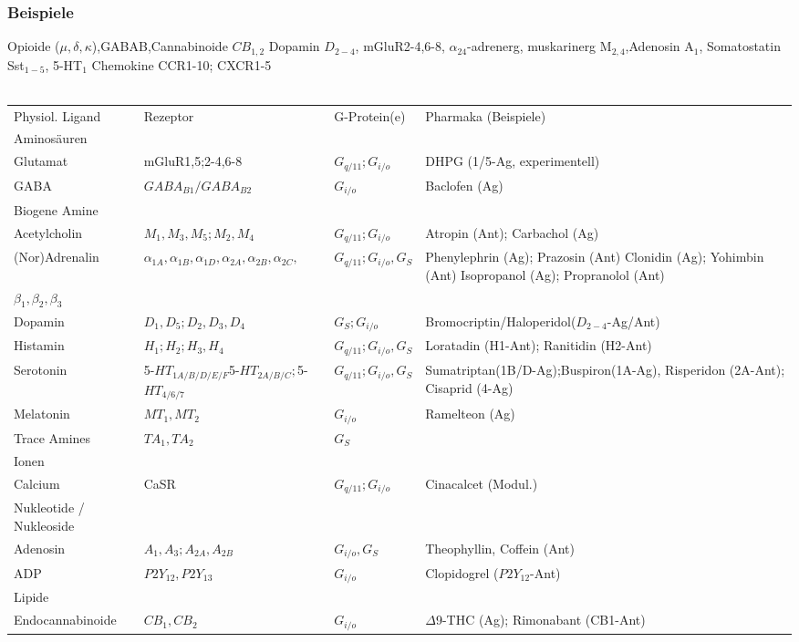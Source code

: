 \documentclass[10pt,a4paper]{report}
\begin{document}
\subsubsection{Beispiele}Opioide ($\mu,\delta,\kappa$),GABAB,Cannabinoide $CB_{1,2}$	Dopamin $D_{2-4}$, mGluR2-4,6-8, $\alpha_24$-adrenerg, muskarinerg M$_{2,4}$,Adenosin A$_1$, Somatostatin Sst$_{1-5}$, 5-HT$_1$
Chemokine CCR1-10; CXCR1-5 \\ \\
\scriptsize
\begin{tabularx}{\textwidth}{XXXX}
Physiol. Ligand&Rezeptor&G-Protein(e)&Pharmaka (Beispiele)\\
Aminosäuren&&&\\
Glutamat&mGluR1,5;2-4,6-8&$G_{q/11}; G_{i/o}$&DHPG (1/5-Ag, experimentell)\\
GABA&$GABA_{B1} / GABA_{B2}$&$G_{i/o}$&Baclofen (Ag)\\
Biogene Amine&&&\\
Acetylcholin&$M_1, M_3, M_5; M_2, M_4$&$G_{q/11}; G_{i/o}$&Atropin (Ant); Carbachol (Ag)\\
(Nor)Adrenalin& $\alpha_{1A}, \alpha_{1B}, \alpha_{1D}, \alpha_{2A}, \alpha_{2B}, \alpha_{2C}, $&$G_{q/11}; G_{i/o}, G_S$&Phenylephrin (Ag); Prazosin (Ant)  Clonidin (Ag); Yohimbin (Ant) Isopropanol (Ag); Propranolol (Ant)\\
$\beta_1, \beta_2, \beta_3$&&\\
Dopamin&$D_1,D_5; D_2,D_3,D_4$& $G_{S}; G_{i/o}$&Bromocriptin/Haloperidol($D_{2-4}$-Ag/Ant)\\
Histamin&$H_1; H_2; H_3,H_4$&$G_{q/11}; G_{i/o}, G_S$&Loratadin (H1-Ant); Ranitidin (H2-Ant)\\
Serotonin&5-$HT_{1A/B/D/E/F}$5-$HT_{2A/B/C}; $5-$HT_{4/6/7}$&$G_{q/11}; G_{i/o}, G_S$& Sumatriptan(1B/D-Ag);Buspiron(1A-Ag), Risperidon (2A-Ant); Cisaprid (4-Ag)\\
Melatonin&$MT_1,MT_2$&$G_{i/o}$&Ramelteon (Ag)\\
Trace Amines&$TA_1, TA_2$&$G_S$&\\
Ionen&&&\\
Calcium&CaSR&$G_{q/11}; G_{i/o}$&Cinacalcet (Modul.)\\
Nukleotide / Nukleoside&&&\\
Adenosin&$A_1,A_3; A_{2A}, A_{2B}$&$G_{i/o}, G_S$&Theophyllin, Coffein (Ant)\\
ADP&$P2Y_{12}, P2Y_{13}$&$G_{i/o}$&Clopidogrel ($P2Y_{12}$-Ant)\\
Lipide&&&\\
Endocannabinoide&$CB_1, CB_2$&$G_{i/o}$&$\Delta$9-THC (Ag); Rimonabant (CB1-Ant)\\

\end{tabularx}
\end{document}

